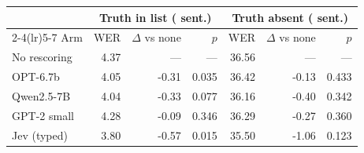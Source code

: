 \begin{tabular}{lrrrrrr}
\toprule
 & \multicolumn{3}{c}{Truth in list (\nInList{} sent.)} & \multicolumn{3}{c}{Truth absent (\nOutList{} sent.)} \\
\cmidrule(lr){2-4}\cmidrule(lr){5-7}
Arm & WER & $\Delta$ vs none & $p$ & WER & $\Delta$ vs none & $p$ \\
\midrule
No rescoring & 4.37 & --- & --- & 36.56 & --- & --- \\
OPT-6.7b & 4.05 & -0.31 & 0.035 & 36.42 & -0.13 & 0.433 \\
Qwen2.5-7B & 4.04 & -0.33 & 0.077 & 36.16 & -0.40 & 0.342 \\
GPT-2 small & 4.28 & -0.09 & 0.346 & 36.29 & -0.27 & 0.360 \\
Jev (typed) & 3.80 & -0.57 & 0.015 & 35.50 & -1.06 & 0.123 \\
\bottomrule
\end{tabular}
